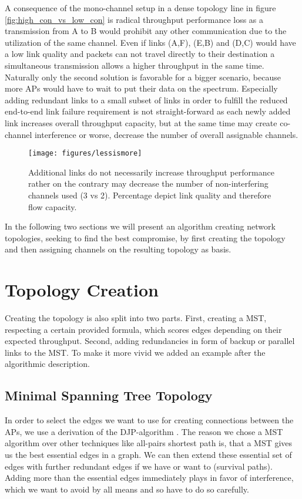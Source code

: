   A consequence of the mono-channel setup in a dense topology line in figure \ref{fig:high_con_vs_low_con} is radical throughput performance loss as a transmission from
  A to B would prohibit any other communication due to the utilization of the same channel. Even if links (A,F), (E,B) and (D,C) would have a low link quality and packets
  can not travel directly to their destination a simultaneous transmission allows a higher throughput in the same time. Naturally only the second solution is favorable for a
  bigger scenario, because more APs would have to wait to put their data on the spectrum.
  Especially adding redundant links to a small subset of links in order to fulfill the reduced end-to-end link failure requirement is not straight-forward as each newly
  added link increases overall throughput capacity, but at the same time may create co-channel interference or worse, decrease the number of overall assignable channels.
  
  \begin{figure}[h!]
    \centering
      \texttt{[image: figures/lessismore]}
      \caption{Additional links do not necessarily increase throughput performance rather on the contrary may decrease the number of non-interfering channels used (3 vs 2).
	Percentage depict link quality and therefore flow capacity.}
    \label{fig:lessismore}
  \end{figure}
  
  In the following two sections we will present an algorithm creating network topologies, seeking to find the best compromise, by first creating the topology and then
  assigning channels on the resulting topology as basis.
 
  \section{Topology Creation}
    Creating the topology is also split into two parts.
    First, creating a \ac{MST}, respecting a certain provided formula, which scores edges depending on their expected throughput.
    Second, adding redundancies in form of backup or parallel links to the \ac{MST}. 
    To make it more vivid we added an example after the algorithmic description.

    \subsection{Minimal Spanning Tree Topology}
      In order to select the edges we want to use for creating connections between the APs, we use a derivation of the \ac{DJP}-algorithm \cite{jarnik, prim}.
      The reason we chose a \ac{MST} algorithm over other techniques like all-pairs shortest path is, that a \ac{MST} gives us the best essential edges in a graph. 
      We can then extend these essential set of edges with further redundant edges if we have or want to (survival paths). 
      Adding more than the essential edges immediately plays in favor of interference, which we want to avoid by all means and so have to do so carefully.
      
